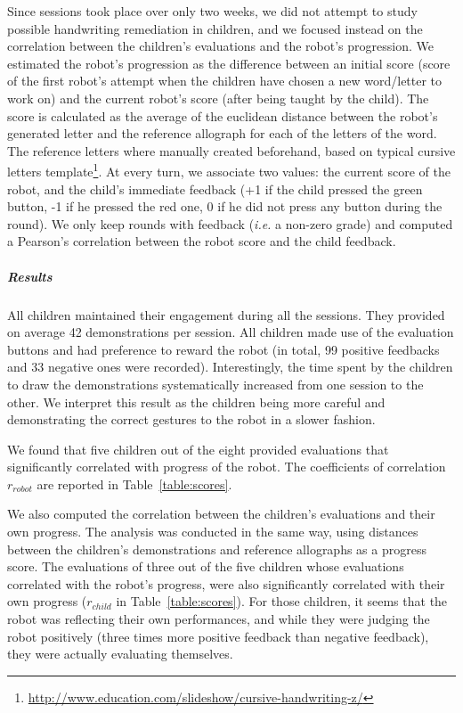 \documentclass[10pt,a4paper]{article}
\newcommand{\ie}{\textit{i.e.}\xspace}
\begin{document}
Since sessions took place over only two weeks, we did not attempt to study possible
handwriting remediation in children, and we focused instead on the correlation between the children's evaluations and the robot's progression.
We estimated the robot's progression as the difference between an initial score
(score of the first robot's attempt when the children have chosen a new word/letter to
work on) and the current robot's score (after being taught by the child). The
score is calculated as the average of the euclidean
distance between the robot's generated letter and the reference allograph for each of the letters of the
word. The reference letters where manually created beforehand, based on typical cursive letters template\footnote{\url{http://www.education.com/slideshow/cursive-handwriting-z/}}. At every turn, we associate two values: the current score of the robot, and the child's immediate feedback (+1 if the child pressed the green button, -1 if he pressed the red one, 0 if he did not press any button during the round). We only keep rounds with feedback (\ie a non-zero grade) and computed a Pearson's correlation between the robot score and the child feedback.
\subparagraph{Results}
All children maintained their engagement during all the sessions. They provided
on average 42 demonstrations per session. All children made use of the evaluation buttons and
had preference to reward the robot (in total, 99 positive feedbacks and 33 negative ones were recorded). Interestingly, the time spent by the children to draw the demonstrations systematically increased from one session to the other. We interpret this result as the children being more careful and demonstrating the correct gestures to the robot in a slower fashion.

We found that five children out of the eight provided evaluations that significantly correlated with progress of the robot. The coefficients of correlation $r_{robot}$ are reported in Table~\ref{table:scores}.

We also computed the correlation between the children's evaluations and their own
progress. The analysis was conducted in the same way, using distances between the children's demonstrations and reference allographs as a progress score.
The evaluations of three out of the five children whose evaluations correlated with the robot's progress, were also significantly correlated with their own progress ($r_{child}$ in Table~\ref{table:scores}). For
those children, it seems that the robot was reflecting their own performances, and while they
were judging the robot positively (three times more positive feedback than negative feedback),
they were actually evaluating themselves.
\end{document}
